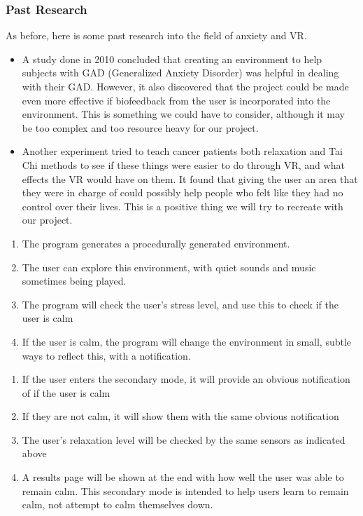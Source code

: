 \documentclass[a4paper,10pt]{article}
\begin{document}
\subsubsection{Past Research}
As before, here is some past research into the field of anxiety and VR.
\begin{itemize}
	\item A study done in 2010 concluded that creating an environment to help subjects with GAD (Generalized Anxiety Disorder) was helpful in dealing with their GAD.  However, it also discovered that the project could be made even more effective if biofeedback from the user is incorporated into the environment.  This is something we could have to consider, although it may be too complex and too resource heavy for our project. \cite{calmOne}
	\item Another experiment tried to teach cancer patients both relaxation and Tai Chi methods to see if these things were easier to do through VR, and what effects the VR would have on them.  It found that giving the user an area that they were in charge of could possibly help people who felt like they had no control over their lives. This is a positive thing we will try to recreate with our project.
\end{itemize}
\pagebreak
\begin{enumerate}
	\item The program generates a procedurally generated environment.
	\item The user can explore this environment, with quiet sounds and music sometimes being played.
	\item The program will check the user's stress level, and use this to check if the user is calm
	\item If the user is calm, the program will change the environment in small, subtle ways to reflect this, with a notification.
\end{enumerate}
\begin{enumerate}
	\item If the user enters the secondary mode, it will provide an obvious notification of if the user is calm
	\item If they are not calm, it will show them with the same obvious notification
	\item The user's relaxation level will be checked by the same sensors as indicated above
	\item A results page will be shown at the end with how well the user was able to remain calm.  This secondary mode is intended to help users learn to remain calm, not attempt to calm themselves down.
\end{enumerate}
\end{document}
